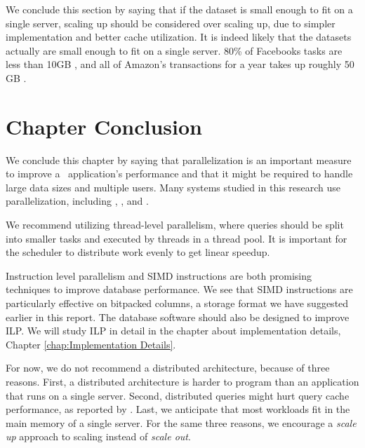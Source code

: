 We conclude this section by saying that if the dataset is small enough to fit on a single server, scaling up should be considered over scaling up, due to simpler implementation and better cache utilization. It is indeed likely that the datasets actually are small enough to fit on a single server. 80\% of Facebooks tasks are less than 10GB \cite{Mukherjee2015-ul}, and all of Amazon's transactions for a year takes up roughly 50 GB \cite{Kemper2011-ap}.

\section{Chapter Conclusion}
\label{sec:Chapter Conclusion}
We conclude this chapter by saying that parallelization is an important measure to improve a \bd~application's performance and that it might be required to handle large data sizes and multiple users. Many systems studied in this research use parallelization, including \exasol, \tableau, and \qlikview.

We recommend utilizing thread-level parallelism, where queries should be split into smaller tasks and executed by threads in a thread pool. It is important for the scheduler to distribute work evenly to get linear speedup.

Instruction level parallelism and SIMD instructions are both promising techniques to improve database performance. We see that SIMD instructions are particularly effective on bitpacked columns, a storage format we have suggested earlier in this report. The database software should also be designed to improve ILP. We will study ILP in detail in the chapter about implementation details, Chapter \ref{chap:Implementation Details}.

For now, we do not recommend a distributed architecture, because of three reasons. First, a distributed architecture is harder to program than an application that runs on a single server. Second, distributed queries might hurt query cache performance, as reported by \qlikview. Last, we anticipate that most workloads fit in the main memory of a single server. For the same three reasons, we encourage a \textit{scale up} approach to scaling instead of \textit{scale out}. 
